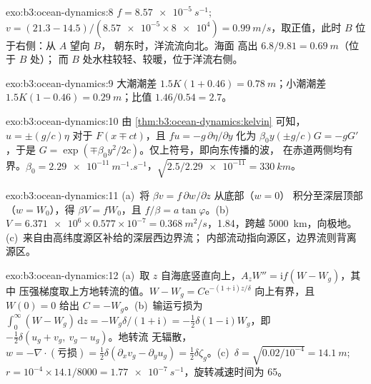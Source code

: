\begin{solution}{exo:b3:ocean-dynamics:8}
$f = \qty{8.57e-5}{s^{-1}}$; $v = (21.3 - 14.5)/(\num{8.57e-5}\times\num{8e4})
= \qty{0.99}{m/s}$，取正值，此时 $B$ 位于右侧：从 $A$ 望向 $B$，
朝东时，洋流流向北。海面
高出 $6.8/9.81 = \qty{0.69}{m}$（位于 $B$ 处）；
而 $B$ 处水柱较轻、较暖，位于洋流右侧。
\end{solution}

\begin{solution}{exo:b3:ocean-dynamics:9}
大潮潮差 $1.5K(1 + 0.46) = \qty{0.78}{m}$；小潮潮差 $1.5K(1 - 0.46)
= \qty{0.29}{m}$；比值 $1.46/0.54 = 2.7$。
\end{solution}

\begin{solution}{exo:b3:ocean-dynamics:10}
由 \cref{thm:b3:ocean-dynamics:kelvin} 可知，$u = \pm(g/c)\eta$ 对于 $F(x \mp
ct)$，且 $fu = -g\,\partial\eta/\partial y$ 化为 $\beta_0y(\pm g/c)G =
-gG'$，于是 $G = \exp(\mp\beta_0y^2/2c)$。仅上符号，即向东传播的波，
在赤道两侧均有界。$\beta_0 =
\qty{2.29e-11}{m^{-1}.s^{-1}}$，$\sqrt{2.5/\num{2.29e-11}} = \qty{330}{km}$。
\end{solution}

\begin{solution}{exo:b3:ocean-dynamics:11}
(a)~将 $\beta v = f\,\partial w/\partial z$ 从底部（$w = 0$）
积分至深层顶部（$w = W_0$），得 $\beta V = fW_0$，且 $f/\beta =
a\tan\varphi$。(b)~$V = \num{6.371e6}\times0.577\times10^{-7} =
\qty{0.368}{m^2/s}$，\qty{1.84}{\sverdrup}，跨越 \qty{5000}{km}，向极地。
(c)~来自由高纬度源区补给的深层西边界流；
内部流动指向源区，边界流则背离
源区。
\end{solution}

\begin{solution}{exo:b3:ocean-dynamics:12}
(a)~取 $z$ 自海底竖直向上，$A_zW'' = \mathrm if(W - W_g)$，其中
压强梯度取上方地转流的值。$W - W_g =
C\mathrm e^{-(1+\mathrm i)z/\delta}$ 向上有界，且 $W(0) = 0$ 给出
$C = -W_g$。(b)~输运亏损为 $\int_0^\infty(W - W_g)\,\mathrm dz
= -W_g\delta/(1+\mathrm i) = -\tfrac12\delta(1 - \mathrm i)W_g$，即
$-\tfrac12\delta(u_g + v_g,\ v_g - u_g)$。地转流
无辐散，$w = -\nabla\cdot(\text{亏损}) = \tfrac12\delta(\partial_x
v_g - \partial_y u_g) = \tfrac12\delta\zeta_g$。(c)~$\delta =
\sqrt{0.02/10^{-4}} = \qty{14.1}{m}$; $r = 10^{-4}\times14.1/8000 =
\qty{1.77e-7}{s^{-1}}$，旋转减速时间为 \num{65}。
\end{solution}

